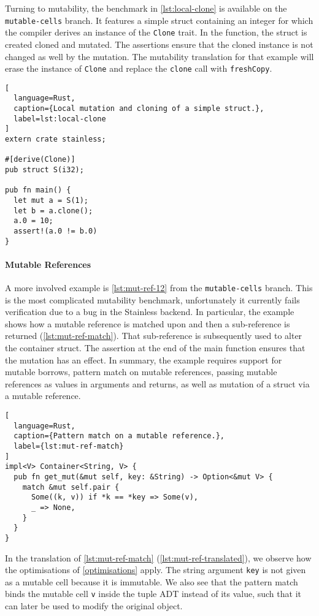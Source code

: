 Turning to mutability, the benchmark in \autoref{lst:local-clone} is available
on the \texttt{mutable-cells} branch. It features a simple struct containing an
integer for which the compiler derives an instance of the \lstinline!Clone!
trait. In the function, the struct is created cloned and mutated. The assertions
ensure that  the cloned instance is not changed as well by the mutation. The
mutability translation for that example will erase the instance of
\lstinline!Clone! and replace the \lstinline!clone! call with
\lstinline!freshCopy!.

\begin{lstlisting}[
  language=Rust,
  caption={Local mutation and cloning of a simple struct.},
  label=lst:local-clone
]
extern crate stainless;

#[derive(Clone)]
pub struct S(i32);

pub fn main() {
  let mut a = S(1);
  let b = a.clone();
  a.0 = 10;
  assert!(a.0 != b.0)
}
\end{lstlisting}


\paragraph{Mutable References}

A more involved example is \autoref{lst:mut-ref-12} from the
\texttt{mutable-cells} branch. This is the most complicated mutability
benchmark, unfortunately it currently fails verification due to a bug in the
Stainless backend. In particular, the example shows how a mutable reference is
matched upon and then a sub-reference is returned (\autoref{lst:mut-ref-match}).
That sub-reference is subsequently used to alter the container struct. The
assertion at the end of the main function ensures that the mutation has an
effect. In summary, the example requires support for mutable borrows, pattern
match on mutable references, passing mutable references as values in arguments
and returns, as well as mutation of a struct via a mutable reference.

\begin{lstlisting}[
  language=Rust,
  caption={Pattern match on a mutable reference.},
  label={lst:mut-ref-match}
]
impl<V> Container<String, V> {
  pub fn get_mut(&mut self, key: &String) -> Option<&mut V> {
    match &mut self.pair {
      Some((k, v)) if *k == *key => Some(v),
      _ => None,
    }
  }
}
\end{lstlisting}

In the translation of \autoref{lst:mut-ref-match}
(\autoref{lst:mut-ref-translated}), we observe how the optimisations of
\autoref{optimisations} apply. The string argument \lstinline!key! is not given
as a mutable cell because it is immutable. We also see that the pattern match
binds the mutable cell \lstinline!v! inside the tuple ADT instead of its value,
such that it can later be used to modify the original object.

